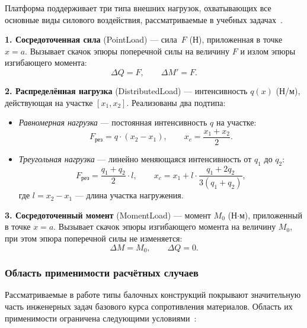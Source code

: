 Платформа поддерживает три типа внешних нагрузок, охватывающих все основные виды силового воздействия, рассматриваемые в учебных задачах~\cite{feodosev, stepin}.

\textbf{1. Сосредоточенная сила} (PointLoad) --- сила~$F$ (Н), приложенная в точке $x = a$. Вызывает скачок эпюры поперечной силы на величину $F$ и излом эпюры изгибающего момента:
\begin{equation}
  \Delta Q = F, \qquad \Delta M' = F.
  \label{eq:point_load_effect}
\end{equation}

\textbf{2. Распределённая нагрузка} (DistributedLoad) --- интенсивность $q(x)$ (Н/м), действующая на участке $[x_1, x_2]$. Реализованы два подтипа:
\begin{itemize}
  \item \textit{Равномерная нагрузка} --- постоянная интенсивность $q$ на участке:
  \begin{equation}
    F_{\text{рез}} = q \cdot (x_2 - x_1), \qquad x_c = \frac{x_1 + x_2}{2}.
    \label{eq:uniform_load}
  \end{equation}
  \item \textit{Треугольная нагрузка} --- линейно меняющаяся интенсивность от $q_1$ до $q_2$:
  \begin{equation}
    F_{\text{рез}} = \frac{q_1 + q_2}{2} \cdot l, \qquad
    x_c = x_1 + l \cdot \frac{q_1 + 2 q_2}{3(q_1 + q_2)},
    \label{eq:triangular_load}
  \end{equation}
  где $l = x_2 - x_1$ --- длина участка нагружения.
\end{itemize}

\textbf{3. Сосредоточенный момент} (MomentLoad) --- момент $M_0$ (Н$\cdot$м), приложенный в точке $x = a$. Вызывает скачок эпюры изгибающего момента на величину $M_0$, при этом эпюра поперечной силы не изменяется:
\begin{equation}
  \Delta M = M_0, \qquad \Delta Q = 0.
  \label{eq:moment_load_effect}
\end{equation}

\subsubsection{Область применимости расчётных случаев}

Рассматриваемые в работе типы балочных конструкций покрывают значительную часть инженерных задач базового курса сопротивления материалов. Область их применимости ограничена следующими условиями~\cite{feodosev, aleksandrov, belyaev}:


